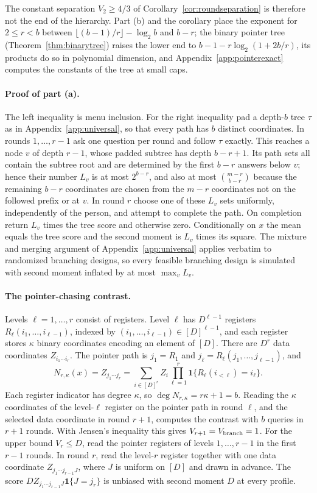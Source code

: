 The constant separation $V_2\ge4/3$ of Corollary~\ref{cor:roundseparation}
is therefore not the end of the hierarchy. Part (b) and the corollary place
the exponent for $2\le r<b$ between $\lfloor(b-1)/r\rfloor-\log_2b$ and $b-r$;
the binary pointer tree (Theorem~\ref{thm:binarytree}) raises the lower end to
$b-1-r\log_2(1+2b/r)$, its products do so in polynomial dimension, and
Appendix~\ref{app:pointerexact} computes the constants of the tree at small caps.

\paragraph{Proof of part (a).}
The left inequality is menu inclusion. For the right inequality pad a
depth-$b$ tree $\tau$ as in Appendix~\ref{app:universal}, so that every path
has $b$ distinct coordinates. In rounds $1,\ldots,r-1$ ask one question per
round and follow $\tau$ exactly. This reaches a node $v$ of depth $r-1$,
whose padded subtree has depth $b-r+1$. Its path sets all contain the subtree
root and are determined by the first $b-r$ answers below $v$; hence their
number $L_v$ is at most $2^{b-r}$, and also at most $\binom{m-r}{b-r}$
because the remaining $b-r$ coordinates are chosen from the $m-r$
coordinates not on the followed prefix or at $v$. In round $r$ choose one of
these $L_v$ sets uniformly, independently of the person, and attempt to
complete the path. On completion return $L_v$ times the tree score and
otherwise zero. Conditionally on $x$ the mean equals the tree score and the
second moment is $L_v$ times its square. The mixture and merging argument of
Appendix~\ref{app:universal} applies verbatim to randomized branching
designs, so every feasible branching design is simulated with second
moment inflated by at most $\max_vL_v$.

\paragraph{The pointer-chasing contrast.}
Levels $\ell=1,\ldots,r$ consist of registers. Level $\ell$ has $D^{\ell-1}$
registers $R_\ell(i_1,\ldots,i_{\ell-1})$, indexed by
$(i_1,\ldots,i_{\ell-1})\in[D]^{\ell-1}$, and each register stores $\kappa$
binary coordinates encoding an element of $[D]$. There are $D^r$ data
coordinates $Z_{i_1\cdots i_r}$. The pointer path is $j_1=R_1$ and
$j_\ell=R_\ell(j_1,\ldots,j_{\ell-1})$, and
\[
 N_{r,\kappa}(x)=Z_{j_1\cdots j_r}
 =\sum_{i\in[D]^r}Z_i\prod_{\ell=1}^r\mathbf 1\{R_\ell(i_{<\ell})=i_\ell\}.
\]
Each register indicator has degree $\kappa$, so $\deg N_{r,\kappa}=r\kappa+1=b$.
Reading the $\kappa$ coordinates of the level-$\ell$ register on the pointer
path in round $\ell$, and the selected data coordinate in round $r+1$,
computes the contrast with $b$ queries in $r+1$ rounds. With Jensen's
inequality this gives $V_{r+1}=V_{\rm branch}=1$. For the upper bound
$V_r\le D$, read the pointer registers of levels $1,\ldots,r-1$ in the first
$r-1$ rounds. In round $r$, read the level-$r$ register together with one
data coordinate $Z_{j_1\cdots j_{r-1}J}$, where $J$ is uniform on $[D]$ and
drawn in advance. The score $DZ_{j_1\cdots j_{r-1}J}\mathbf 1\{J=j_r\}$ is
unbiased with second moment $D$ at every profile.

